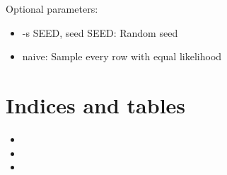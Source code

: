 \documentclass[letterpaper,10pt,english]{sphinxmanual}
\begin{document}
Optional parameters:
\begin{itemize}
\item {} 
-s SEED, \textendash{}seed SEED: Random seed

\item {} 
\textendash{}naive: Sample every row with equal likelihood

\end{itemize}


\chapter{Indices and tables}
\label{\detokenize{index:indices-and-tables}}\begin{itemize}
\item {} 

\item {} 

\item {} 

\end{itemize}



\renewcommand{\indexname}{Index}
\printindex
\end{document}
